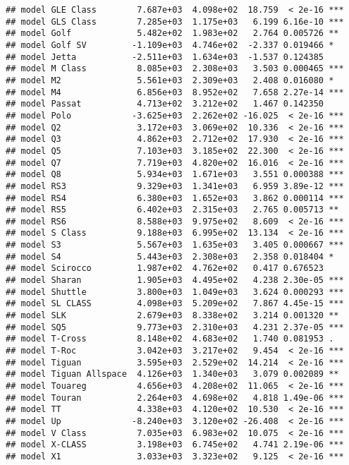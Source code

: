 \documentclass[
]{article}
\begin{document}
\begin{verbatim}
## model GLE Class        7.687e+03  4.098e+02  18.759  < 2e-16 ***
## model GLS Class        7.285e+03  1.175e+03   6.199 6.16e-10 ***
## model Golf             5.482e+02  1.983e+02   2.764 0.005726 ** 
## model Golf SV         -1.109e+03  4.746e+02  -2.337 0.019466 *  
## model Jetta           -2.511e+03  1.634e+03  -1.537 0.124385    
## model M Class          8.085e+03  2.308e+03   3.503 0.000465 ***
## model M2               5.561e+03  2.309e+03   2.408 0.016080 *  
## model M4               6.856e+03  8.952e+02   7.658 2.27e-14 ***
## model Passat           4.713e+02  3.212e+02   1.467 0.142350    
## model Polo            -3.625e+03  2.262e+02 -16.025  < 2e-16 ***
## model Q2               3.172e+03  3.069e+02  10.336  < 2e-16 ***
## model Q3               4.862e+03  2.712e+02  17.930  < 2e-16 ***
## model Q5               7.103e+03  3.185e+02  22.300  < 2e-16 ***
## model Q7               7.719e+03  4.820e+02  16.016  < 2e-16 ***
## model Q8               5.934e+03  1.671e+03   3.551 0.000388 ***
## model RS3              9.329e+03  1.341e+03   6.959 3.89e-12 ***
## model RS4              6.380e+03  1.652e+03   3.862 0.000114 ***
## model RS5              6.402e+03  2.315e+03   2.765 0.005713 ** 
## model RS6              8.588e+03  9.975e+02   8.609  < 2e-16 ***
## model S Class          9.188e+03  6.995e+02  13.134  < 2e-16 ***
## model S3               5.567e+03  1.635e+03   3.405 0.000667 ***
## model S4               5.443e+03  2.308e+03   2.358 0.018404 *  
## model Scirocco         1.987e+02  4.762e+02   0.417 0.676523    
## model Sharan           1.905e+03  4.495e+02   4.238 2.30e-05 ***
## model Shuttle          3.800e+03  1.049e+03   3.624 0.000293 ***
## model SL CLASS         4.098e+03  5.209e+02   7.867 4.45e-15 ***
## model SLK              2.679e+03  8.338e+02   3.214 0.001320 ** 
## model SQ5              9.773e+03  2.310e+03   4.231 2.37e-05 ***
## model T-Cross          8.148e+02  4.683e+02   1.740 0.081953 .  
## model T-Roc            3.042e+03  3.217e+02   9.454  < 2e-16 ***
## model Tiguan           3.595e+03  2.529e+02  14.214  < 2e-16 ***
## model Tiguan Allspace  4.126e+03  1.340e+03   3.079 0.002089 ** 
## model Touareg          4.656e+03  4.208e+02  11.065  < 2e-16 ***
## model Touran           2.264e+03  4.698e+02   4.818 1.49e-06 ***
## model TT               4.338e+03  4.120e+02  10.530  < 2e-16 ***
## model Up              -8.240e+03  3.120e+02 -26.408  < 2e-16 ***
## model V Class          7.035e+03  6.983e+02  10.075  < 2e-16 ***
## model X-CLASS          3.198e+03  6.745e+02   4.741 2.19e-06 ***
## model X1               3.033e+03  3.323e+02   9.125  < 2e-16 ***

\end{verbatim}
\end{document}
